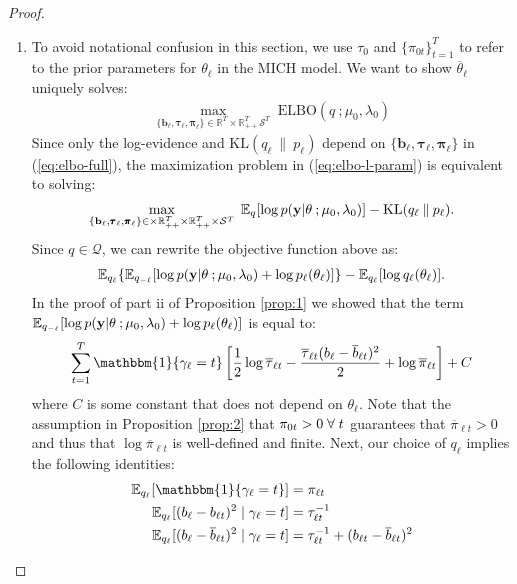 \begin{proof}
\begin{enumerate}[label=\roman*.]
\item To avoid notational confusion in this section, we use $\tau_0$ and $\{\pi_{0t}\}_{t=1}^T$ to refer to the prior parameters for $\theta_\ell$ in the MICH model. We want to show $\overline{\theta}_\ell$ uniquely solves: 
\begin{align}
    \max_{\{\mathbf{b}_\ell, \pmb{\tau}_\ell, \pmb{\pi}_\ell\} \in \mathbb{R}^T\times\mathbb{R}_{++}^T\mathcal{S}^T} \;  \text{ELBO}(q\:;\mu_0,\lambda_0) \label{eq:elbo-l-param}
\end{align}
Since only the log-evidence and $\text{KL}(q_\ell\:\lVert\: p_\ell)$ depend on $\{\mathbf{b}_\ell, \pmb{\tau}_\ell, \pmb{\pi}_\ell\}$ in (\ref{eq:elbo-full}), the maximization problem in (\ref{eq:elbo-l-param}) is equivalent to solving: 
\begin{align*}
    \max_{\{\mathbf{b}_\ell, \pmb{\tau}_\ell, \pmb{\pi}_\ell\} \in \times\mathbb{R}_{++}^T\times\mathbb{R}_{++}^T \times\mathcal{S}^T} \;  \mathbb{E}_q[\log p(\mathbf{y}| \theta\:; \mu_0,\lambda_0)] - \text{KL}(q_\ell\:\lVert\: p_\ell).
\end{align*}
Since $q \in \mathcal{Q}$, we can rewrite the objective function above as:
\begin{align*}
    \mathbb{E}_{q_\ell}\{\mathbb{E}_{q_{-\ell}}[\log p(\mathbf{y}| \theta\:; \mu_0,\lambda_0)+\log p_\ell(\theta_\ell)]\} - \mathbb{E}_{q_\ell}[\log q_\ell(\theta_\ell)].
\end{align*}
In the proof of part ii of Proposition \ref{prop:1} we showed that the term $\mathbb{E}_{q_{-\ell}}[\log p(\mathbf{y}| \theta\:; \mu_0,\lambda_0)+\log p_\ell(\theta_\ell)]$ is equal to:
\begin{align*}
     \sum_{t=1}^T \mathbbm{1}\{\gamma_\ell = t\}\left[\frac{1}{2} \log \overline{\tau}_{\ell t} - \frac{\overline{\tau}_{\ell t}(b_{\ell } - \overline{b}_{\ell t})^2}{2} + \log \overline{\pi}_{\ell t}\right] + C
\end{align*}
where $C$ is some constant that does not depend on $\theta_\ell$. Note that the assumption in Proposition \ref{prop:2} that $\pi_{0t} > 0 \;\forall\; t$ guarantees that $\overline{\pi}_{\ell t} > 0$ and thus that $\log \overline{\pi}_{\ell t}$ is well-defined and finite. Next, our choice of $q_\ell$ implies the following identities:
\begin{align*}
    \E_{q_\ell}[\mathbbm{1}\{\gamma_\ell = t\}] &= \pi_{\ell t} \\
    \E_{q_\ell}[(b_\ell - b_{\ell t})^2\;|\;\gamma_\ell=t] &= \tau_{\ell t}^{-1}\\
    \E_{q_\ell}[(b_\ell - \overline{b}_{\ell t})^2\;|\;\gamma_\ell=t] &= \tau_{\ell t}^{-1} + (b_{\ell t}- \overline{b}_{\ell t})^2

\end{align*}
\end{enumerate}
\end{proof}
